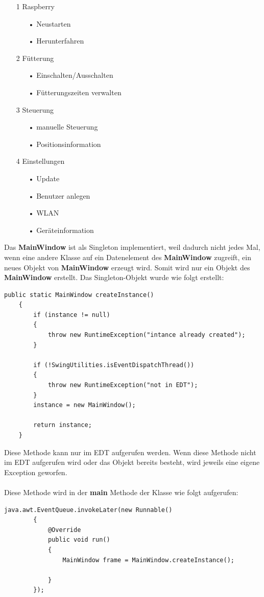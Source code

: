 \begin{itemize}
\item[1] Raspberry
\begin{itemize}
\item[•] Neustarten
\item[•] Herunterfahren
\end{itemize}
\item[2] Fütterung
\begin{itemize}
\item[•] Einschalten/Ausschalten
\item[•] Fütterungszeiten verwalten
\end{itemize}
\item[3] Steuerung
\begin{itemize}
\item[•] manuelle Steuerung
\item[•] Positionsinformation
\end{itemize}
\item[4] Einstellungen
\begin{itemize}
\item[•] Update
\item[•] Benutzer anlegen
\item[•] WLAN
\item[•] Geräteinformation
\end{itemize}
\end{itemize}

\vspace{10pt}

Das \textbf{MainWindow} ist als Singleton implementiert, weil dadurch nicht jedes Mal, wenn eine andere Klasse auf ein Datenelement des \textbf{MainWindow} zugreift, ein neues Objekt von \textbf{MainWindow} erzeugt wird. Somit wird nur ein Objekt des \textbf{MainWindow} erstellt. Das Singleton-Objekt wurde wie folgt erstellt:
\begin{lstlisting}[style=JavaStyle, caption=MainWindow createInstance()]
public static MainWindow createInstance()
    {
        if (instance != null)
        {
            throw new RuntimeException("intance already created");
        }

        if (!SwingUtilities.isEventDispatchThread())
        {
            throw new RuntimeException("not in EDT");
        }
        instance = new MainWindow();

        return instance;
    }
\end{lstlisting}
Diese Methode kann nur im \ac{EDT} aufgerufen werden. Wenn diese Methode nicht im \ac{EDT} aufgerufen wird oder das Objekt bereits besteht, wird jeweils eine eigene Exception geworfen.
\\ \\ Diese Methode wird in der \textbf{main} Methode der Klasse wie folgt aufgerufen:
\begin{lstlisting}[style=JavaStyle, caption=MainWindow createInstance() Aufruf]
	java.awt.EventQueue.invokeLater(new Runnable()
        {
            @Override
            public void run()
            {
                MainWindow frame = MainWindow.createInstance();

            }
        });
\end{lstlisting}

